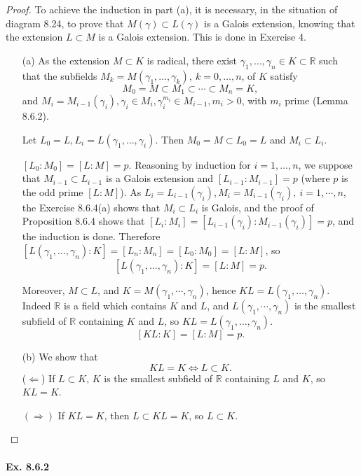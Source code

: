 \documentclass[11pt,a4paper]{article}
\newcommand{\R}{\mathbb{R}}
\begin{document}
\begin{proof}

To achieve the induction in part (a), it is necessary, in the situation of diagram 8.24,  to prove that $M(\gamma) \subset L(\gamma)$ is a Galois extension, knowing that the extension $L\subset M$ is a Galois extension. This is done in Exercise 4.

\begin{enumerate}
\item[(a)]
As the extension $M\subset K$ is radical, there exist  $\gamma_1, \ldots,\gamma_n \in K\subset \R$ such that the subfields  $M_k = M(\gamma_1,\ldots,\gamma_k),\ k=0,\ldots,n$, of $K$ satisfy
$$M_0 = M \subset M_1 \subset \cdots \subset M_n = K,$$
and $M_i = M_{i-1}(\gamma_i), \gamma_i \in M_i, \gamma_i^{m_i} \in M_{i-1}, m_i>0$, with $m_i$ prime (Lemma 8.6.2).

Let $L_0 = L, L_i = L(\gamma_1,\ldots, \gamma_i)$. Then $M_0=M  \subset L_0 = L$ and $M_i \subset L_i$. 


$[L_0:M_0] = [L:M]=p$. Reasoning by induction for $i =1,\ldots,n$, we suppose that $M_{i-1}\subset L_{i-1}$ is a Galois extension and $[L_{i-1} : M_{i-1}] = p$ (where $p$ is the odd prime  $[L:M]$). As $L_i = L_{i-1}(\gamma_i), M_i =M_{i-1}(\gamma_i),\ i=1,\cdots,n$, the Exercise 8.6.4(a) shows that $M_{i}\subset L_{i}$ is Galois, and the proof of Proposition 8.6.4 shows that $[L_i : M_i] = [L_{i-1}(\gamma_i) : M_{i-1}(\gamma_i)] = p$, and the induction is done. Therefore 
$[L(\gamma_1,\ldots,\gamma_n):K] = [L_n:M_n] = [L_0:M_0] = [L:M]$, so
$$[L(\gamma_1,\ldots,\gamma_n):K] = [L:M]=p.$$

Moreover, $M\subset L$, and $K = M(\gamma_1,\cdots,\gamma_n)$, hence $KL = L(\gamma_1,\ldots, \gamma_n)$. Indeed $\R$ is a field which contains $K$ and $L$, and $L(\gamma_1,\cdots, \gamma_n)$ is the smallest subfield of $\R$ containing $K$ and $L$, so $KL = L(\gamma_1,\ldots, \gamma_n)$.
$$[KL : K] = [L:M] = p.$$

\item[(b)]
We show that $$KL = K \iff L \subset K.$$
($\Leftarrow$) If $L \subset K$, $K$ is the smallest subfield of $\R$ containing $L$ and $K$, so $KL = K $.

$(\Rightarrow)$ If $KL=K$, then $L \subset KL = K$, so $L \subset K$.

\end{enumerate}
\end{proof}

\paragraph{Ex. 8.6.2}
\end{document}
